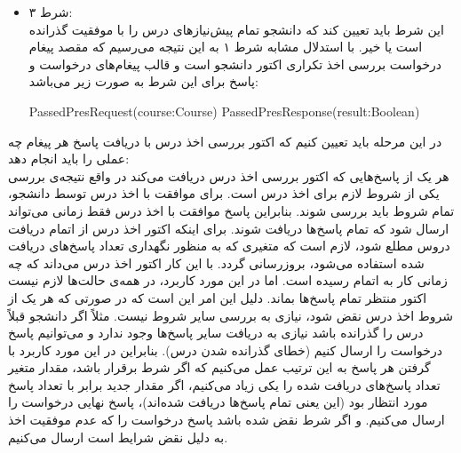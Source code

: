\begin{itemize}
\item شرط ۳:\\
 این شرط باید تعیین کند که دانشجو تمام پیش‌نیازهای درس را با موفقیت گذرانده است یا خیر. با استدلال مشابه شرط ۱ به این نتیجه می‌رسیم که مقصد پیغام درخواست بررسی اخذ تکراری اکتور دانشجو است و قالب پیغام‌های درخواست و پاسخ برای این شرط به صورت زیر می‌باشد:
 \begin{latin}
 PassedPresRequest(course:Course)
 PassedPresResponse(result:Boolean)
 \end{latin}
 
\end{itemize}
در این مرحله باید تعیین کنیم که اکتور بررسی اخذ درس با دریافت پاسخ هر پیغام چه عملی را باید انجام دهد:\\
هر یک از پاسخ‌هایی که اکتور بررسی اخذ درس دریافت می‌کند در واقع نتیجه‌ی بررسی یکی از شروط لازم برای اخذ درس است. برای موافقت با اخذ درس توسط دانشجو، تمام شروط باید بررسی شوند. بنابراین پاسخ موافقت با اخذ درس فقط زمانی می‌تواند ارسال شود که تمام پاسخ‌ها دریافت شوند. برای اینکه اکتور اخذ درس از اتمام دریافت دروس مطلع شود، لازم است که متغیری که به منظور نگهداری تعداد پاسخ‌های دریافت شده استفاده می‌شود، بروزرسانی گردد. با این کار اکتور اخذ درس می‌داند که چه زمانی کار به اتمام رسیده است. اما در این مورد کاربرد، در همه‌ی حالت‌ها لازم نیست اکتور منتظر تمام پاسخ‌ها بماند. دلیل این امر این است که در صورتی که هر یک از شروط اخذ درس نقض شود، نیازی به بررسی سایر شروط نیست. مثلاً اگر دانشجو قبلاً درس را گذرانده باشد نیازی به دریافت سایر پاسخ‌ها وجود ندارد و می‌توانیم پاسخ درخواست را ارسال کنیم (خطای گذرانده شدن درس). بنابراین در این مورد کاربرد با گرفتن هر پاسخ به این ترتیب عمل می‌کنیم که اگر شرط برقرار باشد، مقدار متغیر تعداد پاسخ‌های دریافت شده را یکی زیاد می‌کنیم، اگر مقدار جدید برابر با تعداد پاسخ مورد انتظار بود (این یعنی تمام پاسخ‌ها دریافت شده‌اند)، پاسخ نهایی درخواست را ارسال می‌کنیم. و اگر شرط نقض شده باشد پاسخ درخواست را که عدم موفقیت اخذ به دلیل نقض شرایط است ارسال می‌کنیم.
